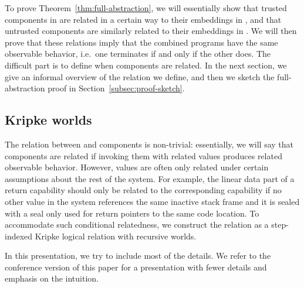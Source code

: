 To prove Theorem~\ref{thm:full-abstraction}, we will essentially show that trusted components in \srccm{} are related in a certain way to their embeddings in \trgcm{}, and that untrusted \trgcm{} components are similarly related to their embeddings in \srccm{}.
We will then prove that these relations imply that the combined programs have the same observable behavior, i.e.\ one terminates if and only if the other does.
The difficult part is to define when components are related.
In the next section, we give an informal overview of the relation we define, and then we sketch the full-abstraction proof in Section~\ref{subsec:proof-sketch}.

\subsection{Kripke worlds}
\label{subsec:worlds}
The relation between \srccm{} and \trgcm{} components is non-trivial: essentially, we will say that components are related if invoking them with related values produces related observable behavior.
However, values are often only related under certain assumptions about the rest of the system.
For example, the linear data part of a return capability should only be related to the corresponding \srccm{} capability if no other value in the system references the same inactive stack frame and it is sealed with a seal only used for return pointers to the same code location.
To accommodate such conditional relatedness, we construct the relation as a step-indexed Kripke logical relation with recursive worlds.
\begin{jversion}
In this presentation, we try to include most of the details.
We refer to the conference version of this paper for a presentation with fewer details and emphasis on the intuition.
\end{jversion}

